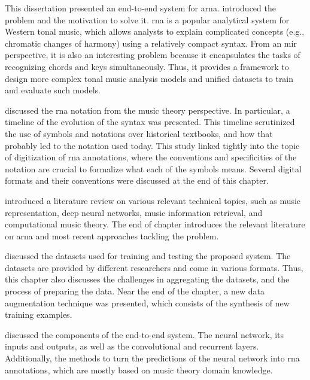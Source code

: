 
This dissertation presented an end-to-end system for
\gls{arna}.  introduced the problem
and the motivation to solve it. \gls{rna} is a popular
analytical system for Western tonal music, which allows
analysts to explain complicated concepts (e.g., chromatic
changes of harmony) using a relatively compact syntax. From
an \gls{mir} perspective, it is also an interesting problem
because it encapsulates the tasks of recognizing chords and
keys simultaneously. Thus, it provides a framework to design
more complex tonal music analysis models and unified
datasets to train and evaluate such models.

 discussed the
\gls{rna} notation from the music theory perspective. In
particular, a timeline of the evolution of the syntax was
presented. This timeline scrutinized the use of symbols and
notations over historical textbooks, and how that probably
led to the notation used today. This study linked tightly
into the topic of digitization of \gls{rna} annotations,
where the conventions and specificities of the notation are
crucial to formalize what each of the symbols means. Several
digital formats and their conventions were discussed at the
end of this chapter.

 introduced a literature review on
various relevant technical topics, such as music
representation, deep neural networks, music information
retrieval, and computational music theory. The end of
chapter introduces the relevant literature on \gls{arna}
and most recent approaches tackling the problem.

 discussed the
datasets used for training and testing the proposed system.
The datasets are provided by different researchers and come
in various formats. Thus, this chapter also discusses the
challenges in aggregating the datasets, and the process of
preparing the data. Near the end of the chapter, a new data
augmentation technique was presented, which consists of the
synthesis of new training examples.

 discussed the components of the
end-to-end system. The neural network, its inputs and
outputs, as well as the convolutional and recurrent layers.
Additionally, the methods to turn the predictions of the
neural network into \gls{rna} annotations, which are mostly
based on music theory domain knowledge.

